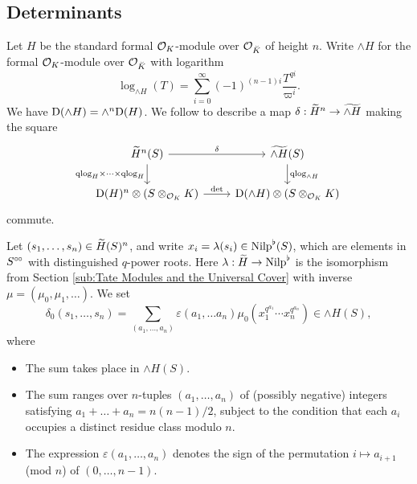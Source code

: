 \documentclass[../main.tex]{subfiles}
\begin{document}
\subsection{Determinants } %
\label{sub:Determinants}
Let $H$ be the standard formal $\cO_K$-module over $\cO_{\breve K}$ of height
$n$. Write $\wedge H$ for the formal $\cO_K$-module over $\cO_{\breve K}$ with
logarithm
\begin{equation*}
  \log_{\wedge H}(T) = \sum_{i = 0}^\infty (-1)^{(n-1)i} \frac{T^{qi}}{\varpi^i}.
\end{equation*}
We have $\Dio(\wedge H) = \wedge^n \Dio(H)$. 
We follow \cite[Theorem 2.10.3]{BoyarchenkoWeinstein2011MaxVar} to describe a map $\delta:
\Tilde H^n \to \Tilde {\wedge H}$ making the square
\begin{equation}\label{diag:qlogsquare}
\begin{tikzcd}[ampersand replacement=\&]
	{\Tilde H^n(S)} \& {\Tilde{\wedge H}(S)} \\
	{\Dio(H)^n \otimes (S\otimes_{\cO_K} K)} \& {\Dio(\wedge H) \otimes(S\otimes_{\cO_K}K)}
	\arrow["\delta", from=1-1, to=1-2]
	\arrow["\qlog_H \times \dots \times \qlog_H"', from=1-1, to=2-1]
  \arrow["\qlog_{\wedge H}", from=1-2, to=2-2]
	\arrow["\det", from=2-1, to=2-2]
\end{tikzcd}
\end{equation}
commute. 

Let $(s_1, \dots, s_n) \in \Tilde H(S)^n$, and write $x_i = \lambda(s_i) \in
\Nilp^\flat(S)$, which are elements in $S^\cici$ with distinguished $q$-power
roots. Here $\lambda: \Tilde H \to \Nilp^\flat$ is the isomorphism from Section
\ref{sub:Tate Modules and the Universal Cover} with inverse $\mu = (\mu_0, \mu_1, \dots)$. 
We set
\begin{equation*}
  \delta_0(s_1, \dots, s_n) = \sum_{(a_1, \dots, a_n)} \varepsilon(a_1, \dots
  a_n) \mu_0(x_1^{q^{a_1}} \cdots x_n^{q^{a_n}}) \in \wedge H(S),
\end{equation*}
where 
\begin{itemize}
  \item The sum takes place in ${\wedge H}(S)$.
  \item The sum ranges over $n$-tuples $(a_1, \dots, a_n)$ of (possibly negative) integers 
    satisfying $a_1 + \dots + a_n = n (n-1)/2$, subject to the
    condition that each $a_i$ occupies a distinct residue class modulo $n$.
  \item The expression $\varepsilon(a_1, \dots, a_n)$ denotes the sign of the 
    permutation $i \mapsto a_{i+1}$ (mod $n$) of $(0, \dots, n-1)$.
\end{itemize}
\end{document}
